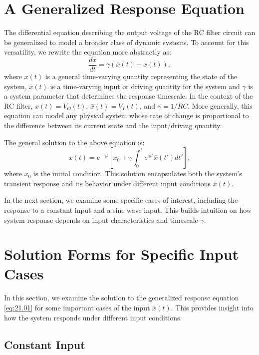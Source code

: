 \section{A Generalized Response Equation}

The differential equation describing the output voltage of the RC filter circuit can be generalized to model a broader class of dynamic systems. To account for this versatility, we rewrite the equation more abstractly as:
\begin{equation}
\frac{dx}{dt} = \gamma(\bar{x}(t) - x(t)),
\label{eq:21.01}
\end{equation}
where $x(t)$ is a general time-varying quantity representing the state of the system, $\bar{x}(t)$ is a time-varying input or driving quantity for the system and $\gamma$ is a system parameter that determines the response timescale. In the context of the RC filter, $x(t)=V_O(t)$, $\bar{x}(t)=V_I(t)$, and $\gamma=1/RC$. More generally, this equation can model any physical system whose rate of change is proportional to the difference between its current state and the input/driving quantity.

The general solution to the above equation is:
\begin{equation}
x(t) = e^{-\gamma t} \left[x_0 + \gamma \int_0^t e^{\gamma t'} \bar{x}(t') dt' \right],
\label{eq:21.02}
\end{equation}
where $x_0$ is the initial condition. This solution encapsulates both the system's transient response and its behavior under different input conditions $\bar{x}(t)$.

In the next section, we examine some specific cases of interest, including the response to a constant input and a sine wave input. This builds intuition on how system response depends on input characteristics and timescale $\gamma$.

\section{Solution Forms for Specific Input Cases}

In this section, we examine the solution to the generalized response equation \eqref{eq:21.01} for some important cases of the input $\bar{x}(t)$. This provides insight into how the system responds under different input conditions.

\subsection{Constant Input}

